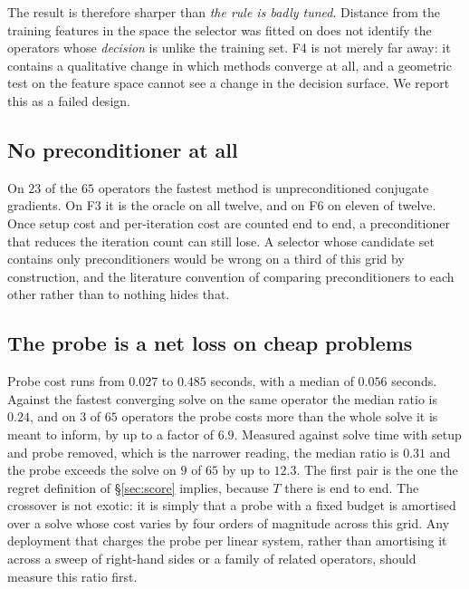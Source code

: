 \documentclass[11pt]{article}
\begin{document}
The result is therefore sharper than \emph{the rule is badly tuned}. Distance from
the training features in the space the selector was fitted on does not identify
the operators whose \emph{decision} is unlike the training set. F4 is not merely
far away: it contains a qualitative change in which methods converge at all, and
a geometric test on the feature space cannot see a change in the decision
surface. We report this as a failed design.

\subsection{No preconditioner at all}

On $23$ of the $65$ operators the fastest method is unpreconditioned conjugate
gradients. On F3 it is the oracle on all twelve, and on F6 on eleven of twelve.
Once setup cost and per-iteration cost are counted end to end, a preconditioner
that reduces the iteration count can still lose. A selector whose candidate set
contains only preconditioners would be wrong on a third of this grid by
construction, and the literature convention of comparing preconditioners to each
other rather than to nothing hides that.

\subsection{The probe is a net loss on cheap problems}
\label{sec:probe}

Probe cost runs from $0.027$ to $0.485$ seconds, with a median of $0.056$
seconds. Against the fastest converging solve on the same operator the median
ratio is $0.24$, and on $3$ of $65$ operators the probe costs more than the whole
solve it is meant to inform, by up to a factor of $6.9$. Measured against solve time with
setup and probe removed, which is the narrower reading, the median ratio is $0.31$ and the
probe exceeds the solve on $9$ of $65$ by up to $12.3$. The first pair is the one the
regret definition of \S\ref{sec:score} implies, because $T$ there is end to end. The crossover is not
exotic: it is simply that a probe with a fixed budget is amortised over a solve
whose cost varies by four orders of magnitude across this grid. Any deployment
that charges the probe per linear system, rather than amortising it across a
sweep of right-hand sides or a family of related operators, should measure this
ratio first.
\end{document}
